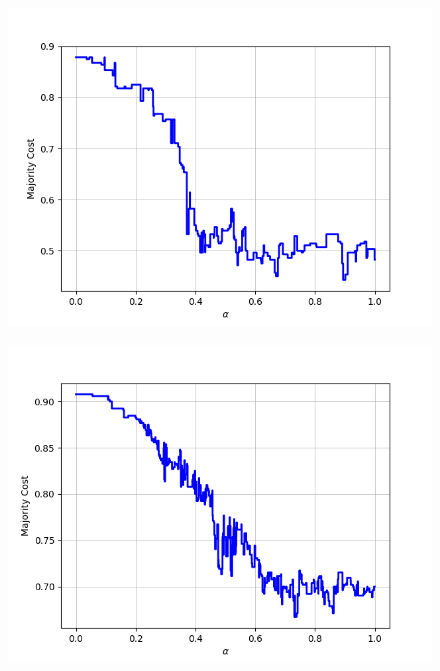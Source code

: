 \begin{figure}[H]
\begin{minipage}{.24\textwidth}
  {\includegraphics[width=\linewidth]{plots/omniglot-intra-sc-cnn/Bengali}}
\end{minipage}
\begin{minipage}{.24\textwidth}
  \centering
  {\includegraphics[width=\linewidth]{plots/omniglot-intra-sc-cnn/Blackfoot_(Canadian_Aboriginal_Syllabics)}}
\end{minipage}
\begin{minipage}{.24\textwidth}
  \centering

\end{minipage}
\end{figure}
